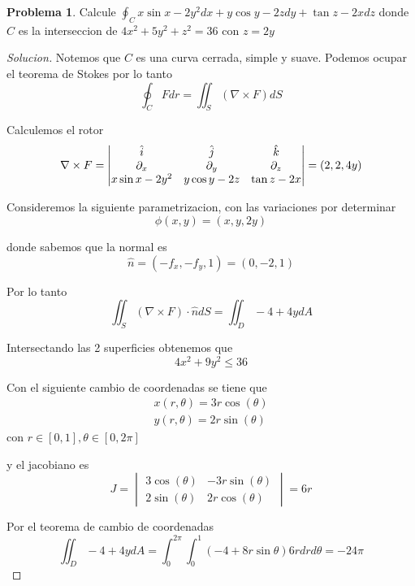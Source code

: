 \documentclass{article}
\theoremstyle{definition}
\newtheorem{problem}{Problema}
\newenvironment{solution}{\begin{proof}[Solucion]}{\end{proof}}
\begin{document}
\begin{problem}
Calcule $\oint_{C} x \sin x - 2y^{2} dx + y \cos y - 2z dy + \tan z - 2x dz$ donde $C$ es la interseccion de $4x^{2} + 5y^{2} + z^{2} = 36$ con $z = 2y$
\end{problem}
\begin{solution}
  Notemos que $C$ es una curva cerrada, simple y suave. Podemos ocupar el teorema de Stokes por lo
  tanto
  \begin{equation*}
    \oint_{C} F dr = \iint_{S} (\nabla \times F) dS
  \end{equation*}

  Calculemos el rotor
  \begin{equation*}
    \nabla \times F = \begin{vmatrix} \hat{i} & \hat{j} & \hat{k}\\ \partial_x & \partial_y & \partial_z\\ x \sin x - 2y^{2} & y \cos y - 2z & \tan z - 2x\end{vmatrix} = (2, 2, 4y)
  \end{equation*}

  Consideremos la siguiente parametrizacion, con las variaciones por determinar
  \begin{equation*}
    \phi(x, y) = (x, y, 2y)
  \end{equation*}

  donde sabemos que la normal es
  \begin{equation*}
    \hat{n} = (-f_{x}, -f_{y}, 1) = (0, -2, 1)
  \end{equation*}

  Por lo tanto
  \begin{equation*}
    \iint_{S} (\nabla \times F) \cdot \hat{n} dS = \iint_{D} -4 + 4y dA
  \end{equation*}

  Intersectando las 2 superficies obtenemos que
  \begin{equation*}
    4x^{2} + 9y^{2} \leq 36
  \end{equation*}

  Con el siguiente cambio de coordenadas se tiene que
  \begin{gather*}
    x(r, \theta) = 3 r \cos(\theta)\\
    y(r, \theta) = 2 r \sin(\theta)
  \end{gather*}
  con $r \in [0, 1], \theta \in [0, 2\pi]$

  y el jacobiano es
  \begin{equation*}
    J = \begin{vmatrix}
      3 \cos(\theta) & -3r\sin(\theta)\\
      2 \sin(\theta) & 2r \cos(\theta)
    \end{vmatrix} = 6r
  \end{equation*}

  Por el teorema de cambio de coordenadas
  \begin{equation*}
    \iint_{D} -4 + 4y dA = \int_{0}^{2\pi}\int_{0}^{1} (-4 + 8r \sin\theta)6r dr d\theta = -24\pi
  \end{equation*}

\end{solution}
\end{document}
